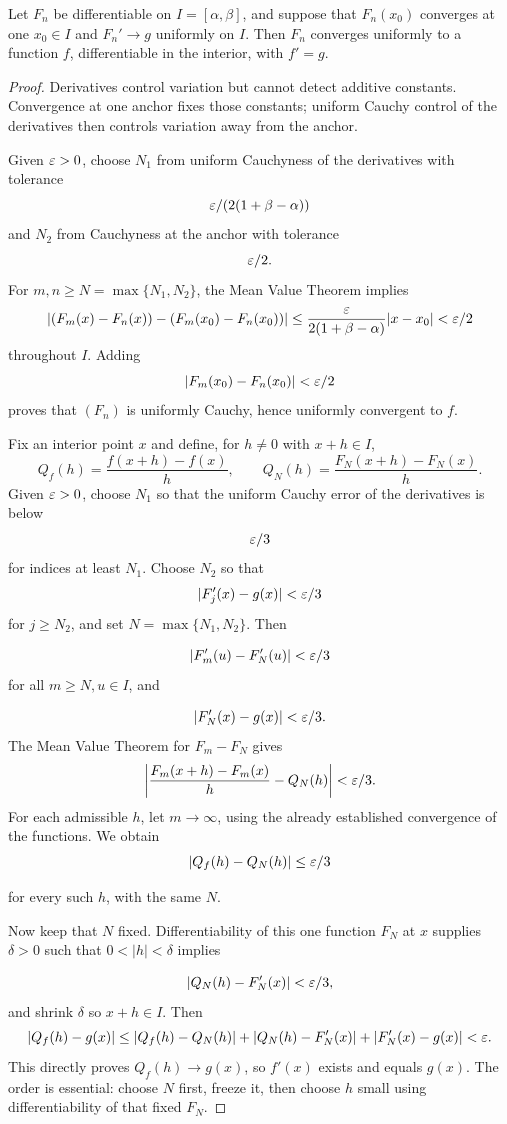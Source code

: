\begin{theorem}
\label{thm:sequence-differentiation}
Let $F_n$ be differentiable on $I=[\alpha,\beta]$, and suppose that
$F_n(x_0)$ converges at one $x_0\in I$ and $F_n'\to g$ uniformly
on $I$. Then $F_n$ converges uniformly to a function $f$, differentiable
in the interior, with $f'=g$.
\end{theorem}
\begin{proof}
Derivatives control variation but cannot detect additive
constants. Convergence at one anchor fixes those constants; uniform Cauchy
control of the derivatives then controls variation away from the anchor.

Given $\varepsilon>0$, choose $N_1$ from uniform Cauchyness of the derivatives
with tolerance
\[
\varepsilon/(2(1+\beta-\alpha))
\]
 and $N_2$ from Cauchyness
at the anchor with tolerance
\[
\varepsilon/2.
\]
 For
$m,n\geq N=\max\{N_1,N_2\}$, the Mean Value Theorem implies
\[
\lvert (F_m(x)-F_n(x))-(F_m(x_0)-F_n(x_0))\rvert
\leq\frac{\varepsilon}{2(1+\beta-\alpha)}\lvert x-x_0\rvert<\varepsilon/2
\]
throughout $I$. Adding
\[
|F_m(x_0)-F_n(x_0)|<\varepsilon/2
\]
 proves that
$(F_n)$ is uniformly Cauchy, hence uniformly convergent to $f$.

Fix an interior point $x$ and define, for $h\ne0$ with $x+h\in I$,
\[
Q_f(h)=\frac{f(x+h)-f(x)}h,\qquad
Q_N(h)=\frac{F_N(x+h)-F_N(x)}h.
\]
Given $\varepsilon>0$, choose $N_1$ so that the uniform Cauchy error of
the derivatives is below
\[
\varepsilon/3
\]
 for indices at least $N_1$.
Choose $N_2$ so that
\[
|F_j'(x)-g(x)|<\varepsilon/3
\]
 for $j\geq N_2$,
and set $N=\max\{N_1,N_2\}$. Then

\[
|F_m'(u)-F_N'(u)|<\varepsilon/3
\]
 for all $m\geq N,u\in I$, and

\[
|F_N'(x)-g(x)|<\varepsilon/3.
\]
 The Mean Value Theorem for $F_m-F_N$ gives
\[
\left|\frac{F_m(x+h)-F_m(x)}h-Q_N(h)\right|<\varepsilon/3.
\]
For each admissible $h$, let $m\to\infty$, using the already established
convergence of the functions. We obtain
\[
|Q_f(h)-Q_N(h)|\leq\varepsilon/3
\]

for every such $h$, with the same $N$.

Now keep that $N$ fixed. Differentiability of this one function $F_N$ at
$x$ supplies $\delta>0$ such that $0<|h|<\delta$ implies

\[
|Q_N(h)-F_N'(x)|<\varepsilon/3,
\]
 and shrink $\delta$ so $x+h\in I$. Then
\[
|Q_f(h)-g(x)|\leq|Q_f(h)-Q_N(h)|
+|Q_N(h)-F_N'(x)|+|F_N'(x)-g(x)|<\varepsilon.
\]
This directly proves $Q_f(h)\to g(x)$, so $f'(x)$ exists and equals
$g(x)$. The order is essential: choose $N$ first, freeze it, then choose
$h$ small using differentiability of that fixed $F_N$.
\end{proof}


